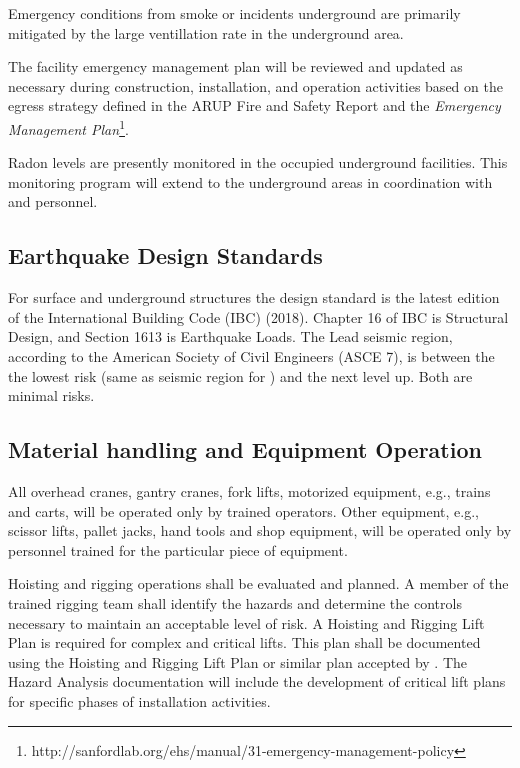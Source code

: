 Emergency conditions from smoke or  incidents underground are
primarily mitigated by the large ventillation rate in the 
underground area.

The facility emergency management plan will be reviewed and updated as
necessary during construction, installation, and operation activities
based on the egress strategy defined in the ARUP Fire and Safety
Report and the {\it {} Emergency Management
  Plan}\footnote{http://sanfordlab.org/ehs/manual/31-emergency-management-policy}.

Radon levels are presently monitored in the occupied underground
facilities. This monitoring program will extend to the 
underground areas in coordination with  and 
 personnel.

\subsection{Earthquake Design Standards}

For surface and underground structures the design standard is the
latest edition of the International Building Code (IBC) (2018).
Chapter 16 of IBC is Structural Design, and Section 1613 is Earthquake
Loads. The Lead seismic region, according to the American Society of
Civil Engineers (ASCE 7), is between the the lowest risk (same as
seismic region for \fnal) and the next level up. Both are minimal
risks.

\subsection{Material handling and Equipment Operation}

All overhead cranes, gantry cranes, fork lifts, motorized equipment,
e.g., trains and carts, will be operated only by trained
operators. Other equipment, e.g., scissor lifts, pallet jacks, hand
tools and shop equipment, will be operated only by personnel trained
for the particular piece of equipment. 

Hoisting and rigging operations shall be evaluated and planned.  A
member of the trained rigging team shall identify the hazards and
determine the controls necessary to maintain an acceptable level of
risk.  A Hoisting and Rigging Lift Plan is required for complex and
critical lifts. This plan shall be documented using the \fnal Hoisting
and Rigging Lift Plan or similar plan accepted by \fnal. The Hazard
Analysis documentation will include the development of critical lift
plans for specific phases of installation activities.

